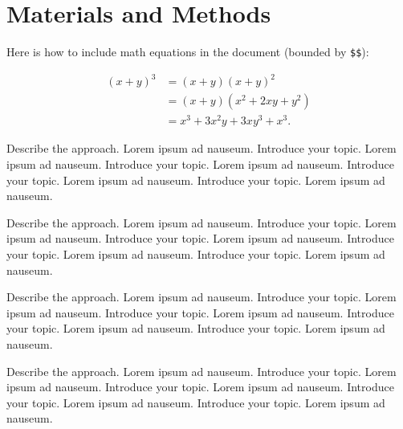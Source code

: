 \documentclass{bioinfo}
\begin{document}
\section{Materials and Methods}

Here is how to include math equations in the document (bounded by
\texttt{\$\$}):

\[
\begin{aligned}
(x+y)^3&=(x+y)(x+y)^2\\
       &=(x+y)(x^2+2xy+y^2) \label{eqn:example} \\
       &=x^3+3x^2y+3xy^3+x^3. 
\end{aligned}
\]

Describe the approach. Lorem ipsum ad nauseum. Introduce your topic.
Lorem ipsum ad nauseum. Introduce your topic. Lorem ipsum ad nauseum.
Introduce your topic. Lorem ipsum ad nauseum. Introduce your topic.
Lorem ipsum ad nauseum.

Describe the approach. Lorem ipsum ad nauseum. Introduce your topic.
Lorem ipsum ad nauseum. Introduce your topic. Lorem ipsum ad nauseum.
Introduce your topic. Lorem ipsum ad nauseum. Introduce your topic.
Lorem ipsum ad nauseum.

Describe the approach. Lorem ipsum ad nauseum. Introduce your topic.
Lorem ipsum ad nauseum. Introduce your topic. Lorem ipsum ad nauseum.
Introduce your topic. Lorem ipsum ad nauseum. Introduce your topic.
Lorem ipsum ad nauseum.

Describe the approach. Lorem ipsum ad nauseum. Introduce your topic.
Lorem ipsum ad nauseum. Introduce your topic. Lorem ipsum ad nauseum.
Introduce your topic. Lorem ipsum ad nauseum. Introduce your topic.
Lorem ipsum ad nauseum.
\end{document}
